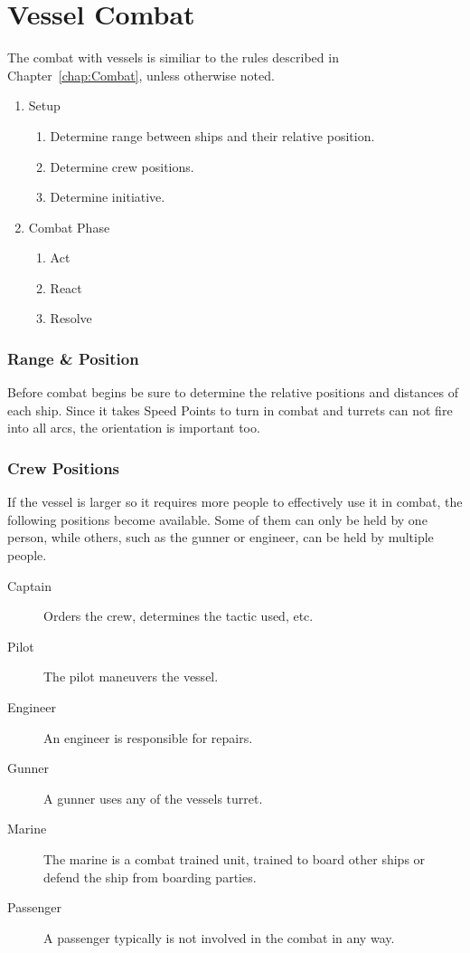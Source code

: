 \chapter{Vessel Combat}
\label{chap:Vessel Combat}

The combat with vessels is similiar to the rules described in Chapter~\ref{chap:Combat}, unless otherwise noted.

\begin{enumerate}
  \item Setup
  \begin{enumerate}
    \item Determine range between ships and their relative position.
    \item Determine crew positions.
    \item Determine initiative.
  \end{enumerate}
  \item Combat Phase
  \begin{enumerate}
    \item Act
    \item React
    \item Resolve
  \end{enumerate}
\end{enumerate}

\subsection{Range \& Position}
\label{sub:Vessels-Combat-Setup-Range}

Before combat begins be sure to determine the relative positions and distances of each ship. Since it takes Speed Points to turn in combat and turrets can not fire into all arcs, the orientation is important too.

\subsection{Crew Positions}
\label{sub:Vessels-Combat-Setup-Crew-Positions}

If the vessel is larger so it requires more people to effectively use it in combat, the following positions become available. Some of them can only be held by one person, while others, such as the gunner or engineer, can be held by multiple people.

\begin{description}
  \item[Captain] Orders the crew, determines the tactic used, etc.
  \item[Pilot] The pilot maneuvers the vessel.
  \item[Engineer] An engineer is responsible for repairs.
  \item[Gunner] A gunner uses any of the vessels turret.
  \item[Marine] The marine is a combat trained unit, trained to board other ships or defend the ship from boarding parties.
  \item[Passenger] A passenger typically is not involved in the combat in any way.
\end{description}

